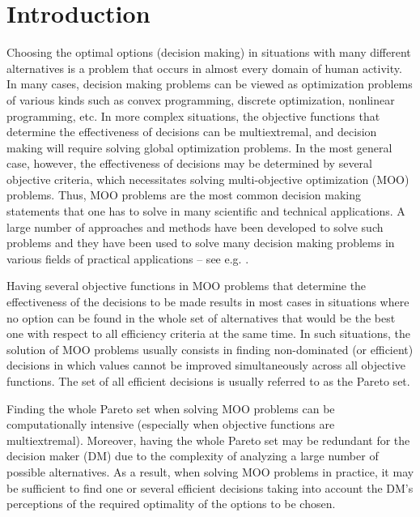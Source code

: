 \documentclass[runningheads]{llncs}
\begin{document}
\section{Introduction} \label{sec:01}


Choosing the optimal options (decision making) in situations with many different alternatives is a problem that occurs in almost every domain of human activity. In many cases, decision making problems can be viewed as optimization problems of various kinds such as convex programming, discrete optimization, nonlinear programming, etc. In more complex situations, the objective functions that determine the effectiveness of decisions can be multiextremal, and decision making will require solving global optimization problems. In the most general case, however, the effectiveness of decisions may be determined by several objective criteria, which necessitates solving multi-objective optimization (MOO) problems. Thus, MOO problems are the most common decision making statements that one has to solve in many scientific and technical applications. A large number of approaches and methods have been developed to solve such problems and they have been used to solve many decision making problems in various fields of practical applications -- see e.g. \cite{c1,c2,c3,c4,c5,c6,c7,c8,c9}.

Having several objective functions in MOO problems that determine the effectiveness of the decisions to be made results in most cases in situations where no option can be found in the whole set of alternatives that would be the best one with respect to all efficiency criteria at the same time. In such situations, the solution of MOO problems usually consists in finding non-dominated (or efficient) decisions in which values cannot be improved simultaneously across all objective functions. The set of all efficient decisions is usually referred to as the Pareto set.

Finding the whole Pareto set when solving MOO problems can be computationally intensive (especially when objective functions are multiextremal). Moreover, having the whole Pareto set may be redundant for the decision maker (DM) due to the complexity of analyzing a large number of possible alternatives. As a result, when solving MOO problems in practice, it may be sufficient to find one or several efficient decisions taking into account the DM's perceptions of the required optimality of the options to be chosen.
\end{document}
